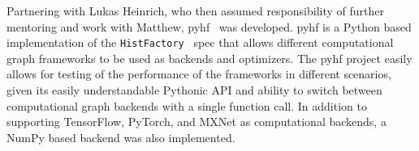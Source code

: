 Partnering with Lukas Heinrich, who then assumed responsibility of further mentoring and work with Matthew, pyhf~\cite{lukas_heinrich_2018_1172961} was developed.
pyhf is a Python based implementation of the \texttt{HistFactory}~\cite{Cranmer:2012sba} spec that allows different computational graph frameworks to be used as backends and optimizers.
The pyhf project easily allows for testing of the performance of the frameworks in different scenarios, given its easily understandable Pythonic API and ability to switch between computational graph backends with a single function call.
In addition to supporting TensorFlow, PyTorch, and MXNet as computational backends, a NumPy based backend was also implemented.\\
